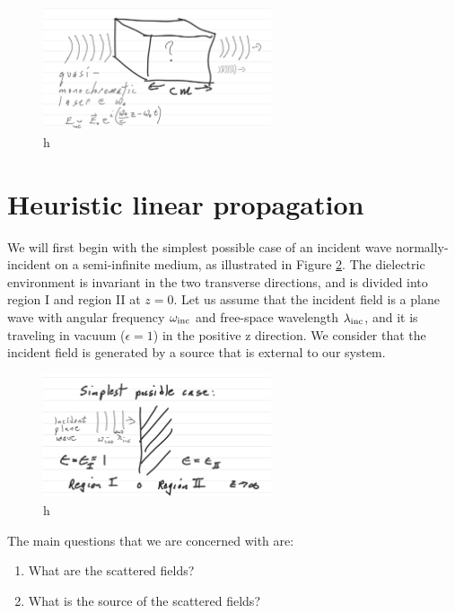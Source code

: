 \documentclass{article}
\begin{document}
\begin{figure}
    \label{fig:nonlinear_crystal}
    \includegraphics[width=0.6\textwidth]{figures/nonlinear_crystal.png}
    \centering
    \caption{h}
\end{figure}

\section{Heuristic linear propagation}
We will first begin with the simplest possible case of an incident wave normally-incident on a semi-infinite medium, as illustrated in Figure \ref{fig:plane_wave_normal_incidence}. The dielectric environment is invariant in the two transverse directions, and is divided into region I and region II at $z=0$. Let us assume that the incident field is a plane wave with angular frequency $\omega_{\rm{inc}}$ and free-space wavelength $\lambda_{\rm{inc}}$, and it is traveling in vacuum ($\epsilon=1$) in the positive z direction. We consider that the incident field is generated by a source that is external to our system. 

\begin{figure}
    \label{fig:plane_wave_normal_incidence}
    \includegraphics[width=0.6\textwidth]{figures/plane_wave_normal_incidence.png}
    \centering
    \caption{h}
\end{figure}

The main questions that we are concerned with are:
\begin{enumerate}
    \item What are the scattered fields?
    \item What is the source of the scattered fields?
\end{enumerate}
\end{document}
